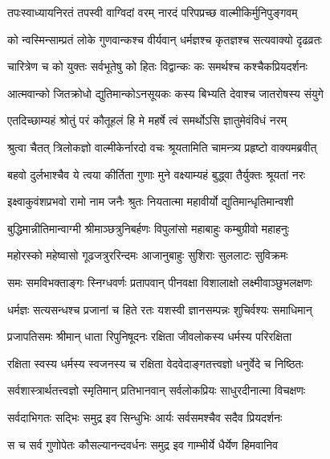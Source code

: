 
\twolineshloka
{तपःस्वाध्यायनिरतं तपस्वी वाग्विदां वरम्}
{नारदं परिपप्रच्छ वाल्मीकिर्मुनिपुङ्गवम्} %

\twolineshloka
{को न्वस्मिन्साम्प्रतं लोके गुणवान्कश्च वीर्यवान्}
{धर्मज्ञश्च कृतज्ञश्च सत्यवाक्यो दृढव्रतः} %

\twolineshloka
{चारित्रेण च को युक्तः सर्वभूतेषु को हितः}
{विद्वान्कः कः समर्थश्च कश्चैकप्रियदर्शनः} %

\twolineshloka
{आत्मवान्को जितक्रोधो द्युतिमान्कोऽनसूयकः}
{कस्य बिभ्यति देवाश्च जातरोषस्य संयुगे} %

\twolineshloka
{एतदिच्छाम्यहं श्रोतुं परं कौतूहलं हि मे}
{महर्षे त्वं समर्थोऽसि ज्ञातुमेवंविधं नरम्} %

\twolineshloka
{श्रुत्वा चैतत् त्रिलोकज्ञो वाल्मीकेर्नारदो वचः}
{श्रूयतामिति चामन्त्र्य प्रहृष्टो वाक्यमब्रवीत्} %

\twolineshloka
{बहवो दुर्लभाश्चैव ये त्वया कीर्तिता गुणाः}
{मुने वक्ष्याम्यहं बुद्ध्वा तैर्युक्तः श्रूयतां नरः} %

\twolineshloka
{इक्ष्वाकुवंशप्रभवो रामो नाम जनैः श्रुतः}
{नियतात्मा महावीर्यो द्युतिमान्धृतिमान्वशी} %

\twolineshloka
{बुद्धिमान्नीतिमान्वाग्मी श्रीमाञ्छत्रुनिबर्हणः}
{विपुलांसो महाबाहुः कम्बुग्रीवो महाहनुः} %

\twolineshloka
{महोरस्को महेष्वासो गूढजत्रुररिन्दमः}
{आजानुबाहुः सुशिराः सुललाटः सुविक्रमः} %

\twolineshloka
{समः समविभक्ताङ्गः स्निग्धवर्णः प्रतापवान्}
{पीनवक्षा विशालाक्षो लक्ष्मीवाञ्छुभलक्षणः} %

\twolineshloka
{धर्मज्ञः सत्यसन्धश्च प्रजानां च हिते रतः}
{यशस्वी ज्ञानसम्पन्नः शुचिर्वश्यः समाधिमान्} %

\twolineshloka
{प्रजापतिसमः श्रीमान् धाता रिपुनिषूदनः}
{रक्षिता जीवलोकस्य धर्मस्य परिरक्षिता} %

\twolineshloka
{रक्षिता स्वस्य धर्मस्य स्वजनस्य च रक्षिता}
{वेदवेदाङ्गतत्त्वज्ञो धनुर्वेदे च निष्ठितः} %

\twolineshloka
{सर्वशास्त्रार्थतत्त्वज्ञो स्मृतिमान् प्रतिभानवान्}
{सर्वलोकप्रियः साधुरदीनात्मा विचक्षणः} %

\twolineshloka
{सर्वदाभिगतः सद्भिः समुद्र इव सिन्धुभिः}
{आर्यः सर्वसमश्चैव सदैव प्रियदर्शनः} %

\twolineshloka
{स च सर्व गुणोपेतः कौसल्यानन्दवर्धनः}
{समुद्र इव गाम्भीर्ये धैर्येण हिमवानिव} %

